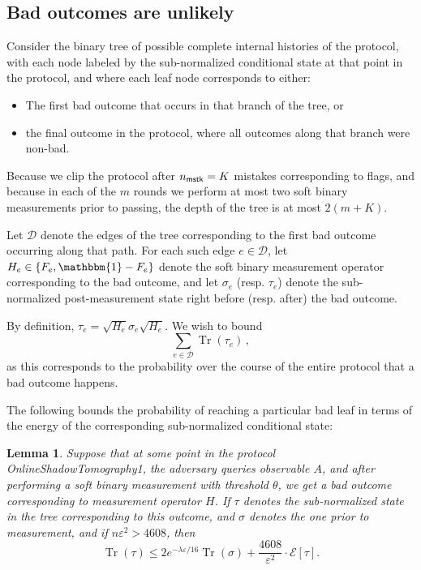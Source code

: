 \documentclass[10pt]{article}
\renewcommand{\epsilon}{\varepsilon}
\newcommand{\energy}{\mathcal{E}}
\DeclareMathOperator{\Tr}{Tr}
\newcommand{\Id}{\mathbbm{1}}
\newtheorem{lemma}[theorem]{Lemma}
\begin{document}
\subsection{Bad outcomes are unlikely}
\label{sec:badunlikely}


Consider the binary tree of possible complete internal histories of the protocol, with each node labeled by the sub-normalized conditional state at that point in the protocol, and where each leaf node corresponds to either:
\begin{itemize}
    \item The first bad outcome that occurs in that branch of the tree, or
    \item the final outcome in the protocol, where all outcomes along that branch were non-bad.
\end{itemize}
Because we clip the protocol after $n_{\sf mstk} = K$ mistakes corresponding to flags, and because in each of the $m$ rounds we perform at most two soft binary measurements prior to passing, the depth of the tree is at most $2(m+K)$.

Let $\mathcal{D}$ denote the edges of the tree corresponding to the first bad outcome occurring along that path. For each such edge $e\in\mathcal{D}$, let $H_e \in \{F_e, \Id - F_e\}$ denote the soft binary measurement operator corresponding to the bad outcome, and let $\sigma_e$ (resp. $\tau_e$) denote the sub-normalized post-measurement state right before (resp. after) the bad outcome. 

By definition, $\tau_e = \sqrt{H_e}\sigma_e\sqrt{H_e}$. We wish to bound 
\begin{equation}
    \sum_{e\in\mathcal{D}} \Tr(\tau_e)\,, \label{eq:sumbad}
\end{equation}
as this corresponds to the probability over the course of the entire protocol that a bad outcome happens.

The following bounds the probability of reaching a particular bad leaf in terms of the energy of the corresponding sub-normalized conditional state:

\begin{lemma}\label{lem:selfbound1}
    Suppose that at some point in the protocol {\sc OnlineShadowTomography1}, the adversary queries observable $A$, and after performing a soft binary measurement with threshold $\theta$, we get a bad outcome corresponding to measurement operator $H$. If $\tau$ denotes the sub-normalized state in the tree corresponding to this outcome, and $\sigma$ denotes the one prior to measurement, and if $n\epsilon^2 > 4608$, then
    \begin{equation}
        \Tr(\tau) \le 2e^{-\lambda\epsilon/16}\Tr(\sigma) + \frac{4608}{\epsilon^2}\cdot \energy[\tau].
    \end{equation}
\end{lemma}
\end{document}
